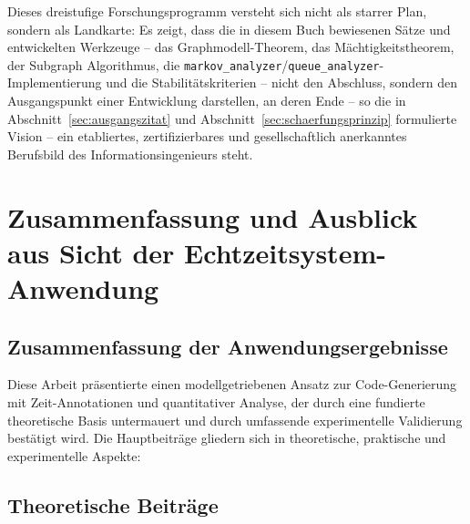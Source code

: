 ﻿\documentclass[a4paper,12pt]{report}
\theoremstyle{definition}
\begin{document}
\noindent
Dieses dreistufige Forschungsprogramm versteht sich nicht als starrer Plan,
sondern als Landkarte: Es zeigt, dass die in diesem Buch bewiesenen Sätze
und entwickelten Werkzeuge -- das Graphmodell-Theorem, das
Mächtigkeitstheorem, der Subgraph Algorithmus, die
\texttt{markov\_analyzer}/\texttt{queue\_analyzer}-Implementierung und die
Stabilitätskriterien -- nicht den Abschluss, sondern den Ausgangspunkt
einer Entwicklung darstellen, an deren Ende -- so die in
Abschnitt~\ref{sec:ausgangszitat} und Abschnitt~\ref{sec:schaerfungsprinzip}
formulierte Vision -- ein etabliertes, zertifizierbares und gesellschaftlich
anerkanntes Berufsbild des Informationsingenieurs steht.

\section{Zusammenfassung und Ausblick aus Sicht der Echtzeitsystem-Anwendung}
\label{sec:zusammenfassung-anwendung}

\subsection{Zusammenfassung der Anwendungsergebnisse}

Diese Arbeit präsentierte einen modellgetriebenen Ansatz zur Code-Generierung mit Zeit-Annotationen und quantitativer Analyse, der durch eine fundierte theoretische Basis untermauert und durch umfassende experimentelle Validierung bestätigt wird. Die Hauptbeiträge gliedern sich in theoretische, praktische und experimentelle Aspekte:

\subsection{Theoretische Beiträge}
\end{document}
